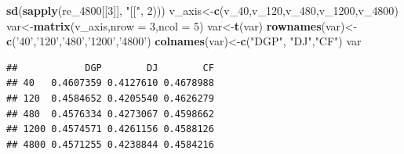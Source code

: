 \documentclass[
]{article}
\newenvironment{Shaded}{\begin{snugshade}}{\end{snugshade}}
\newcommand{\DataTypeTok}[1]{\textcolor[rgb]{0.13,0.29,0.53}{#1}}
\newcommand{\DecValTok}[1]{\textcolor[rgb]{0.00,0.00,0.81}{#1}}
\newcommand{\KeywordTok}[1]{\textcolor[rgb]{0.13,0.29,0.53}{\textbf{#1}}}
\newcommand{\NormalTok}[1]{#1}
\newcommand{\StringTok}[1]{\textcolor[rgb]{0.31,0.60,0.02}{#1}}
\begin{document}
\begin{Shaded}
\begin{Highlighting}[]
        \KeywordTok{sd}\NormalTok{(}\KeywordTok{sapply}\NormalTok{(re_}\DecValTok{4800}\NormalTok{[[}\DecValTok{3}\NormalTok{]], }\StringTok{"[["}\NormalTok{, }\DecValTok{2}\NormalTok{)))}
\NormalTok{v_axis<-}\KeywordTok{c}\NormalTok{(v_}\DecValTok{40}\NormalTok{,v_}\DecValTok{120}\NormalTok{,v_}\DecValTok{480}\NormalTok{,v_}\DecValTok{1200}\NormalTok{,v_}\DecValTok{4800}\NormalTok{)}
\NormalTok{var<-}\KeywordTok{matrix}\NormalTok{(v_axis,}\DataTypeTok{nrow =} \DecValTok{3}\NormalTok{,}\DataTypeTok{ncol =} \DecValTok{5}\NormalTok{)}
\NormalTok{var<-}\KeywordTok{t}\NormalTok{(var)}
\KeywordTok{rownames}\NormalTok{(var)<-}\KeywordTok{c}\NormalTok{(}\StringTok{'40'}\NormalTok{,}\StringTok{'120'}\NormalTok{,}\StringTok{'480'}\NormalTok{,}\StringTok{'1200'}\NormalTok{,}\StringTok{'4800'}\NormalTok{)}
\KeywordTok{colnames}\NormalTok{(var)<-}\KeywordTok{c}\NormalTok{(}\StringTok{"DGP"}\NormalTok{, }\StringTok{"DJ"}\NormalTok{,}\StringTok{"CF"}\NormalTok{)}
\NormalTok{var}
\end{Highlighting}
\end{Shaded}

\begin{verbatim}
##            DGP        DJ        CF
## 40   0.4607359 0.4127610 0.4678988
## 120  0.4584652 0.4205540 0.4626279
## 480  0.4576334 0.4273067 0.4598662
## 1200 0.4574571 0.4261156 0.4588126
## 4800 0.4571255 0.4238844 0.4584216
\end{verbatim}
\end{document}
